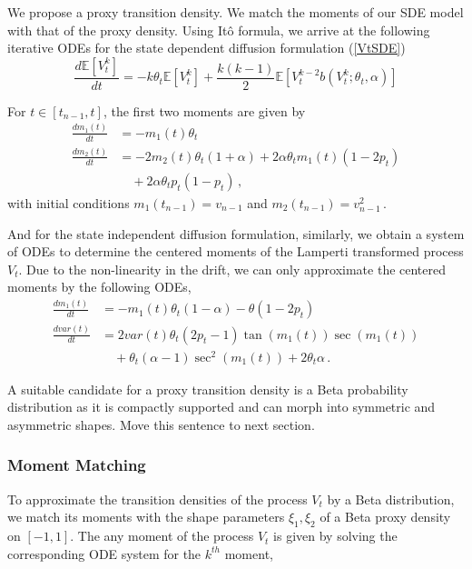 \documentclass[11pt]{article}
\theoremstyle{definition}
\begin{document}
We propose a proxy transition density. We match the moments of our SDE model with that of the proxy density. Using It\^o formula, we arrive at the following iterative ODEs for the state dependent diffusion formulation (\ref{VtSDE})
\begin{equation}
\frac{d \mathbb{E}[ V^k_t]}{dt} = - k \theta_t \mathbb{E}[ V^k_t] + \frac{k(k-1)}{2} \mathbb{E}[ V^{k-2}_t  b(V^k_t;\theta_t, \alpha)]
\end{equation}

For $t\in [t_{n-1}, t]$, the first two moments are given by
\begin{align}
\frac{d m_1 (t)}{dt} &= - m_1(t)\theta_t   \nonumber \\
\frac{d m_2 (t)}{dt} &=  -2 m_2(t)\theta_t(1+\alpha) + 2\alpha\theta_t m_1(t)(1-2p_t)  \nonumber \\
&\quad + 2 \alpha\theta_t p_t (1-p_t) \,,
\end{align}
with initial conditions $m_1(t_{n-1})= v_{n-1}$ and $m_2(t_{n-1})= v_{n-1}^2 \,.$

And for the state independent diffusion formulation, similarly, we  obtain a system of ODEs to determine the centered moments of the Lamperti transformed process $V_t$. Due to the non-linearity in the drift, we can only approximate the centered moments by the following ODEs,
\begin{align}
\frac{d m_1 (t)}{dt} &= - m_1(t)\theta_t (1-\alpha) - \theta (1-2 p_t) \nonumber \\
\frac{d var(t)}{dt} &=  2 var(t) \theta_t (2p_t - 1 ) \tan(m_1 (t)) \sec(m_1 (t))   \nonumber \\
& \quad + \theta_t (\alpha - 1) \sec^2(m_1 (t))  + 2 \theta_t \alpha \,.
\end{align}

A suitable candidate for a proxy transition density is a Beta probability distribution as it is compactly supported and can morph into symmetric and asymmetric shapes. {\color{red} Move this sentence to next section.}

\subsubsection*{ Moment Matching}
To approximate the transition densities of  the process $V_t$ by a Beta distribution, we match its moments with the shape parameters $\xi_1, \xi_2$ of a Beta proxy density on $[-1,1]$. The any moment of the process $V_t$ is  given by solving the corresponding ODE system  for the $k^{th}$  moment,
\end{document}
